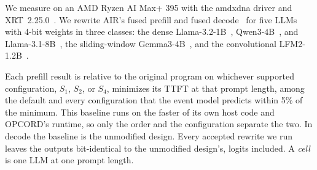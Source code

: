 We measure on an AMD Ryzen\texttrademark{} AI Max+ 395 with the amdxdna driver and XRT~2.25.0~\citep{xdna-driver,xrt-repo}.
We rewrite AIR's fused prefill and fused decode~\citep{wang2026mlirair} for five LLMs with 4-bit weights in three classes: the dense Llama-3.2-1B~\citep{meta2024llama32}, Qwen3-4B~\citep{qwen2025qwen3}, and Llama-3.1-8B~\citep{meta2024llama31}, the sliding-window Gemma3-4B~\citep{farabet2025gemma3}, and the convolutional LFM2-1.2B~\citep{liquidai2025lfm2}.

Each prefill result is relative to the original program on whichever supported configuration, $S_1$, $S_2$, or $S_4$, minimizes its TTFT at that prompt length, among the default and every configuration that the event model predicts within 5\% of the minimum.
This baseline runs on the faster of its own host code and OPCORD's runtime, so only the order and the configuration separate the two.
In decode the baseline is the unmodified design.
Every accepted rewrite we run leaves the outputs bit-identical to the unmodified design's, logits included.
A \emph{cell} is one LLM at one prompt length.

